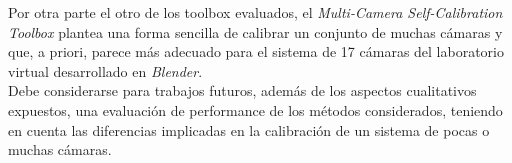 Por otra parte el otro de los toolbox evaluados, el \textit{Multi-Camera Self-Calibration Toolbox} plantea una forma sencilla de calibrar un conjunto de muchas cámaras y que, a priori, parece más adecuado para el sistema de 17 cámaras del laboratorio virtual desarrollado en \emph{Blender}.\\

Debe considerarse para trabajos futuros, además de los aspectos cualitativos expuestos,  una evaluación de performance de los métodos considerados, teniendo en cuenta las diferencias implicadas en la calibración de un sistema de pocas o muchas cámaras.\\